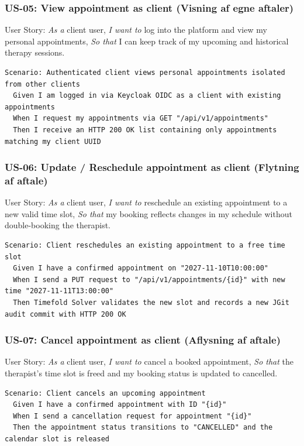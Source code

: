 \documentclass[11pt,a4paper]{article}
\begin{document}
\begin{table}[htbp]
\begin{table}[htbp]
\subsubsection{US-05: View appointment as client (Visning af egne aftaler)}
User Story: \textit{As a} client user, \textit{I want to} log into the platform and view my personal appointments, \textit{So that} I can keep track of my upcoming and historical therapy sessions.
\begin{lstlisting}[language={}]
Scenario: Authenticated client views personal appointments isolated from other clients
  Given I am logged in via Keycloak OIDC as a client with existing appointments
  When I request my appointments via GET "/api/v1/appointments"
  Then I receive an HTTP 200 OK list containing only appointments matching my client UUID
\end{lstlisting}

\subsubsection{US-06: Update / Reschedule appointment as client (Flytning af aftale)}
User Story: \textit{As a} client user, \textit{I want to} reschedule an existing appointment to a new valid time slot, \textit{So that} my booking reflects changes in my schedule without double-booking the therapist.
\begin{lstlisting}[language={}]
Scenario: Client reschedules an existing appointment to a free time slot
  Given I have a confirmed appointment on "2027-11-10T10:00:00"
  When I send a PUT request to "/api/v1/appointments/{id}" with new time "2027-11-11T13:00:00"
  Then Timefold Solver validates the new slot and records a new JGit audit commit with HTTP 200 OK
\end{lstlisting}

\subsubsection{US-07: Cancel appointment as client (Aflysning af aftale)}
User Story: \textit{As a} client user, \textit{I want to} cancel a booked appointment, \textit{So that} the therapist's time slot is freed and my booking status is updated to cancelled.
\begin{lstlisting}[language={}]
Scenario: Client cancels an upcoming appointment
  Given I have a confirmed appointment with ID "{id}"
  When I send a cancellation request for appointment "{id}"
  Then the appointment status transitions to "CANCELLED" and the calendar slot is released
\end{lstlisting}


\end{table}
\end{table}
\end{document}
